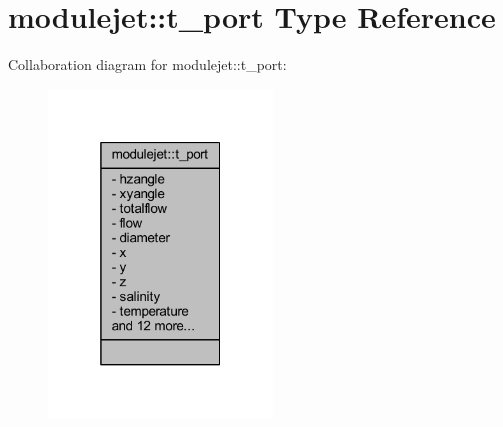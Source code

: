 \hypertarget{structmodulejet_1_1t__port}{}\section{modulejet\+:\+:t\+\_\+port Type Reference}
\label{structmodulejet_1_1t__port}


Collaboration diagram for modulejet\+:\+:t\+\_\+port\+:\nopagebreak
\begin{figure}[H]
\begin{center}
\leavevmode
\includegraphics[width=169pt]{structmodulejet_1_1t__port__coll__graph}
\end{center}
\end{figure}
